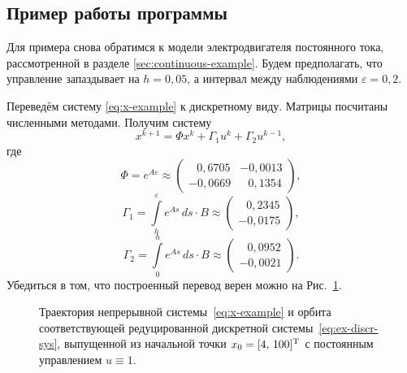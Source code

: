 \subsection{Пример работы программы}

Для примера снова обратимся к модели электродвигателя постоянного тока, рассмотренной в разделе \ref{sec:continuous-example}. Будем предполагать, что управление запаздывает на $h = 0,\!05$, а интервал между наблюдениями $\varepsilon = 0,\!2$.

Переведём систему \eqref{eq:x-example} к дискретному виду. Матрицы посчитаны численными методами. Получим систему
\begin{equation}\label{eq:ex-discr-sys}
x^{k+1} = \Phi x^k + \Gamma_1 u^k + \Gamma_2 u^{k-1},
\end{equation}
где
$$
        \Phi = e^{A\varepsilon} \approx \begin{pmatrix}
\;\;\,0,\!6705 & -0,\!0013 \\
-0,\!0669 & \;\;\,0,\!1354
        \end{pmatrix},
$$
$$
        \Gamma_1 = \int\limits_{h}^{\varepsilon}
        e^{As}\,ds \cdot B \approx
\begin{pmatrix}
\;\;\,0,\!2345 \\
-0,\!0175
\end{pmatrix}, 
$$
$$
        \Gamma_2 = \int\limits_{0}^{h}
        e^{As}\,ds \cdot B \approx
        \begin{pmatrix}
\;\;\,0,\!0952 \\
-0,\!0021
        \end{pmatrix}.
$$
Убедиться в том, что построенный перевод верен можно на Рис.~\ref{img:cont-and-disc}.
\begin{figure}[h]
        \noindent{}
        \caption{Траектория непрерывной системы~\eqref{eq:x-example} и орбита соответствующей редуцированной дискретной системы~\eqref{eq:ex-discr-sys}, выпущенной из начальной точки $x_0 = [4,\, 100]^\mathrm{T}$ с постоянным управлением $u \equiv 1$.
        }
        \label{img:cont-and-disc}
\end{figure}

